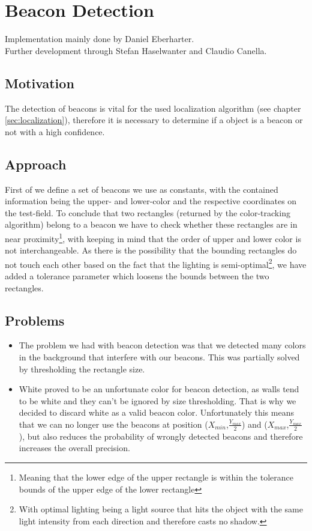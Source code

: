\documentclass[703031]{iisreport}
\begin{document}
\section{Beacon Detection}
Implementation mainly done by Daniel Eberharter. \\
Further development through Stefan Haselwanter and Claudio Canella.

\subsection{Motivation}
The detection of beacons is vital for the used localization algorithm (see chapter \ref{sec:localization}), therefore it is necessary to determine if a object is a beacon or not with a high confidence.

\subsection{Approach}
First of we define a set of beacons we use as constants, with the contained information being the upper- and lower-color and the respective coordinates on the test-field. To conclude that two rectangles (returned by the color-tracking algorithm) belong to a beacon we have to check whether these rectangles are in near proximity\footnote{Meaning that the lower edge of the upper rectangle is within the tolerance bounds of the upper edge of the lower rectangle}, with keeping in mind that the order of upper and lower color is not interchangeable. 
As there is the possibility that the bounding rectangles do not touch each other based on the fact that the lighting is semi-optimal\footnote{With optimal lighting being a light source that hits the object with the same light intensity from each direction and therefore casts no shadow.}, we have added a tolerance parameter which loosens the bounds between the two rectangles.

\subsection{Problems}
	\begin{itemize}
		\item The problem we had with beacon detection was that we detected many colors in the background that interfere with our beacons. This was partially solved by thresholding the rectangle size.
		\item White proved to be an unfortunate color for beacon detection, as walls tend to be white and they can't be ignored by size thresholding. That is why we decided to discard white as a valid beacon color. Unfortunately this means that we can no longer use the beacons at position ($X_{min}$,$\frac{Y_{max}}{2}$) and ($X_{max}$,$\frac{Y_{max}}{2}$), but also reduces the probability of wrongly detected beacons and therefore increases the overall precision.
	\end{itemize}
\end{document}
